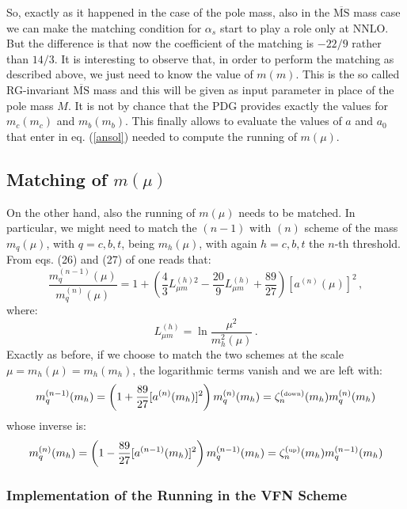 \documentclass[10pt,a4paper]{article}
\begin{document}
So, exactly as it happened in the case of the pole mass, also in the $\overline{\mbox{MS}}$ mass case we can make the matching condition for $\alpha_s$ start to play a role only at NNLO. But the difference is that now the coefficient of the matching is $-22/9$ rather than $14/3$. It is interesting to observe that, in order to perform the matching as described above, we just need to know the value of $m(m)$. This is the so called RG-invariant $\overline{\mbox{MS}}$ mass and this will be given as input parameter in place of the pole mass $M$. It is not by chance that the PDG provides exactly the values for $m_c(m_c)$ and $m_b(m_b)$. This finally allows to evaluate the values of $a$ and $a_0$ that enter in eq. (\ref{ansol}) needed to compute the running of $m(\mu)$. 

\subsection{Matching of $m(\mu)$}

On the other hand, also the running of $m(\mu)$ needs to be matched. In particular, we might need to match the $(n-1)$ with $(n)$ scheme of the mass $m_q(\mu)$, with $q=c,b,t$, being $m_h(\mu)$, with again $h=c,b,t$ the $n$-th threshold. From eqs. (26) and (27) of \cite{Chetyrkin:2000yt} one reads that:
\begin{equation}
\frac{m_q^{(n-1)}(\mu)}{m_q^{(n)}(\mu)}=1+\left(\frac43L_{\mu
    m}^{(h)2}-\frac{20}9L_{\mu
    m}^{(h)}+\frac{89}{27}\right)[a^{(n)}(\mu)]^2\,,
\label{mqmc}
\end{equation}
where:
\begin{equation}
L_{\mu m}^{(h)} =\ln\frac{\mu^2}{m_h^2(\mu)}\,.
\end{equation}
Exactly as before, if we choose to match the two schemes at the scale $\mu=m_h(\mu)=m_h(m_h)$, the logarithmic terms vanish and we are left with:
\begin{equation}
m_q^{(n-1)}(m_h)=\left(1+\frac{89}{27}[a^{(n)}(m_h)]^2\right)m_q^{(n)}(m_h)=\zeta_n^{(\mbox{\tiny down})}(m_h)m_q^{(n)}(m_h)
\end{equation}
whose inverse is:
\begin{equation}
m_q^{(n)}(m_h)=\left(1-\frac{89}{27}[a^{(n-1)}(m_h)]^2\right)m_q^{(n-1)}(m_h)=\zeta_n^{(\mbox{\tiny up})}(m_h)m_q^{(n-1)}(m_h)
\end{equation}

\subsubsection{Implementation of the Running in the VFN Scheme}
\end{document}
